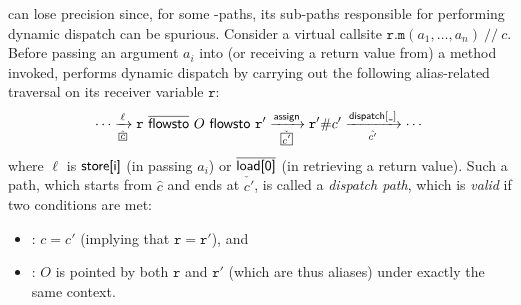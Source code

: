 \LFC can lose precision  since, for some \LFC-paths, its sub-paths responsible for
performing dynamic dispatch can be spurious. Consider a virtual callsite $ \texttt{r}.\mathtt{m}(a_1, \dots, a_n) ~ //~ c$.  
Before passing an argument $a_i$ into (or receiving a return value from) a
method invoked, \LFC performs dynamic dispatch  
by carrying out
the following alias-related traversal on its receiver variable $\mathtt{r}$:
\begin{equation}
\label{eq:dispatchpath}
\cdots \xrightarrow[\hat{\boxed{c}}]{\ell} \mathtt{r} ~
\iflowsto ~ O ~ \flowsto ~\mathtt{r}'
 \xrightarrow[\check{\boxed{c'}}]{\assign} \mathtt{r}'\#c'
 \xrightarrow[\hat{c'}]{\indispatch[\texttt{\_}]}\cdots
 \end{equation}
 where $\ell$ is $\textsf{store[i]}$ (in passing $a_i$) or $\overline{\textsf{load[0]}}$ (in
 retrieving a return value). Such a path, which starts from 
 $\hat{\boxed{c}}$ and ends at $\check{\boxed{c'}}$, is called 
 a \textit{dispatch path}, which
is \emph{valid} if  two conditions are met:
\begin{itemize}
    \item \dispatchconOne: $c=c'$ (implying that $\mathtt{r}=\mathtt{r}'$), and
    \item \dispatchconTwo: $O$ is pointed by both $\mathtt{r}$ and $\mathtt{r}'$ (which
    are thus aliases) under   exactly the same context.
\end{itemize} 

